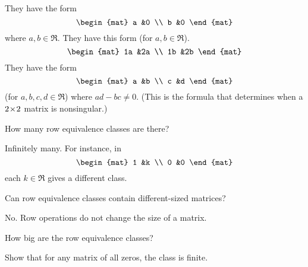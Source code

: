 \begin{exercises}
\begin{answer}
\begin{exparts}
        \partsitem They have the form
          \begin{equation*}
            \begin{mat}
              a  &0  \\
              b  &0
            \end{mat}
          \end{equation*}
          where \( a,b\in\Re \).
        \partsitem They have this form (for \( a,b\in\Re \)).
          \begin{equation*}
            \begin{mat}
             1a  &2a \\
             1b  &2b
            \end{mat}
          \end{equation*}
        \partsitem They have the form
          \begin{equation*}
            \begin{mat}
              a  &b  \\
              c  &d
            \end{mat}
          \end{equation*}
          (for \( a,b,c,d\in\Re \)) where \( ad-bc\neq 0 \).
          (This is the formula that determines when a \( 2 \! \times \! 2 \) matrix
          is nonsingular.)
      \end{exparts}  
    \end{answer}
  \item 
    How many row equivalence classes are there?
    \begin{answer}
       Infinitely many.
       For instance, in 
       \begin{equation*}
         \begin{mat}
           1  &k  \\
           0  &0
         \end{mat}
       \end{equation*}
       each $k\in\Re$ gives a different class.  
    \end{answer}
  \item 
    Can row equivalence classes contain different-sized matrices?
    \begin{answer}
      No.
      Row operations do not change the size of a matrix.  
    \end{answer}
  \item 
    How big are the row equivalence classes?
    \begin{exparts} 
      \partsitem Show that for any matrix of all zeros, the class is finite.

\end{exparts}
\end{exercises}
